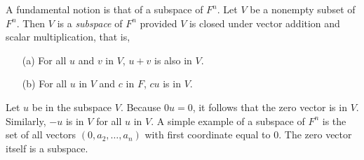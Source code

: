 A fundamental notion \cite{yao2002can} is that of a subspace of $F^n$. Let $V$ be a nonempty subset of 
$F^n$. Then $V$ is a {\it subspace} of $F^n$ provided $V$ is closed 
under vector addition and scalar multiplication, that is, 
\begin{enumerate} 
\item[\rm (a)] For all $u$ and $v$ in $V$, $u+v$ is 
also in $V$. 
\item[\rm (b)] For all $u$ in $V$ and $c$ in $F$, $cu$ is 
in $V$. 
\end{enumerate} 
Let $u$ be in the subspace $V$. Because $0u=0$, 
it follows that the zero vector is in $V$. Similarly, $-u$ is in $V$ 
for all $u$ in $V$. A simple example of a subspace of $F^n$ is the set 
of all vectors $(0,a_2,\ldots,a_n)$ with first coordinate equal to 0. 
The zero vector itself is a subspace.

